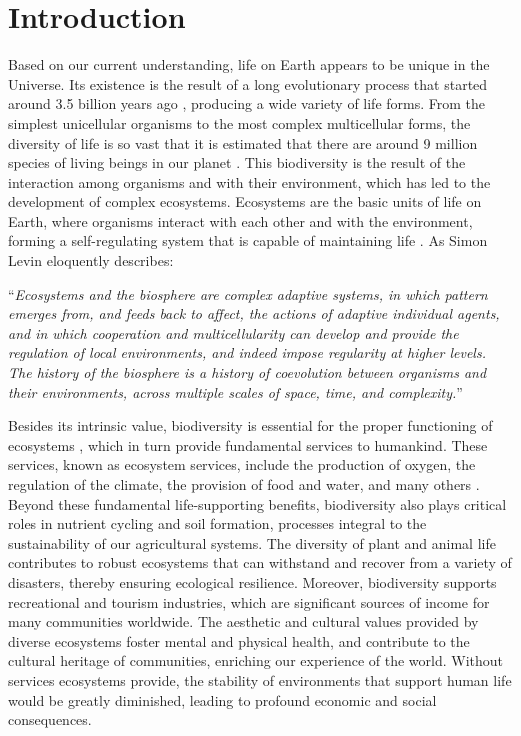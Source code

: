 \setcounter{page}{0}

\section{\label{sec:Introduction_1} Introduction}

Based on our current understanding, life on Earth appears to be unique in the
Universe. Its existence is the result of a long evolutionary process that
started around 3.5 billion years ago \cite{Taylor_1993,Schopf2006},
producing a wide variety of life forms. From the simplest unicellular organisms
to the most complex multicellular forms, the diversity of life is so vast that
it is estimated that there are around 9 million species of living beings in our
planet \cite{Cardinale2012}. This biodiversity is the result of the interaction
among organisms and with their environment, which has led to the development of
complex ecosystems. Ecosystems are the basic units of life on Earth, where
organisms interact with each other and with the environment, forming a
self-regulating system that is capable of maintaining life \cite{Levin2005}.
As Simon Levin eloquently describes:

\begin{displayquote}
  ``\textit{Ecosystems and the biosphere are complex adaptive systems, in which
    pattern
    emerges from, and feeds back to affect, the actions of adaptive individual
    agents, and in which cooperation and multicellularity can develop and
    provide
    the regulation of local environments, and indeed impose regularity at
    higher
    levels. The history of the biosphere is a history of coevolution between
    organisms and their environments, across multiple scales of space, time,
    and
    complexity.}''
\end{displayquote}

Besides its intrinsic value, biodiversity is essential for the proper
functioning of ecosystems \cite{Gamfeldt2008}, which in turn provide
fundamental services to humankind. These services, known as ecosystem services,
include the production of oxygen, the regulation of the climate, the provision
of food and water, and many others \cite{Daily1997}. Beyond these fundamental
life-supporting benefits, biodiversity also plays critical roles in nutrient
cycling and soil formation, processes integral to the sustainability of our
agricultural systems. The diversity of plant and animal life contributes to
robust ecosystems that can withstand and recover from a variety of disasters,
thereby ensuring ecological resilience. Moreover, biodiversity supports
recreational and tourism industries, which are significant sources of income
for many communities worldwide. The aesthetic and cultural values provided by
diverse ecosystems foster mental and physical health, and contribute to the
cultural heritage of communities, enriching our experience of the world.
Without services ecosystems provide, the stability of environments that support
human life would be greatly diminished, leading to profound economic and social
consequences.

